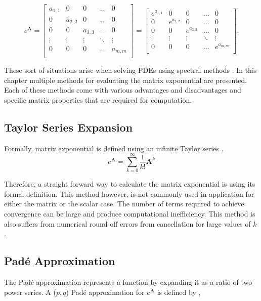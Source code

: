 $$
e^{\boldsymbol{A}} = 
\begin{bmatrix}
a_{1,1} & 0 & 0 & \hdots & 0 \\
0 & a_{2,2} & 0 & \hdots & 0 \\
0 & 0 & a_{3,3} & \hdots & 0 \\
\vdots & \vdots & \vdots & \ddots & \vdots\\
0 & 0 & 0 & \hdots & a_{m,m} \\
\end{bmatrix}
=
\begin{bmatrix}
e^{a_{1,1}} & 0 & 0 & \hdots & 0 \\
0 & e^{a_{2,2}} & 0 & \hdots & 0 \\
0 & 0 & e^{a_{3,3}} & \hdots & 0 \\
\vdots & \vdots & \vdots & \ddots & \vdots\\
0 & 0 & 0 & \hdots & e^{a_{m,m}} \\
\end{bmatrix}
.
$$

\noindent
These sort of situations arise when solving PDEs using spectral methods \cite{ash2009} \cite{cox2002} \cite{kazimi1990}. In this chapter multiple methods for evaluating the matrix exponential are presented. Each of these methods come with various advantages and disadvantages and specific matrix properties that are required for computation. 


\subsection{Taylor Series Expansion}
Formally,  matrix exponential is defined using an infinite Taylor series \cite{exokit} \cite{moler2003} \cite{pusa2010}. 
\begin{equation}
    e^{\boldsymbol{A}} = \sum_{k = 0}^{\infty}\frac{1}{k!}\boldsymbol{A}^{k}
    \label{eq:power_series_exp}
\end{equation}

\noindent Therefore, a straight forward way to calculate the matrix exponential is using its formal definition. This method however, is not commonly used in application for either the matrix or the scalar case. The number of terms required to achieve convergence can be large and produce computational inefficiency. This method is also suffers from numerical round off errors from cancellation for large values of $k$ \cite{moler2003}. 


\subsection{Pad\'e Approximation}
The Pad\'e approximation represents a function by expanding it as a ratio of two power series. A ($p,q$) Pad\'e approximation for $e^{\boldsymbol{A}}$ is defined by \cite{moler2003}, 

